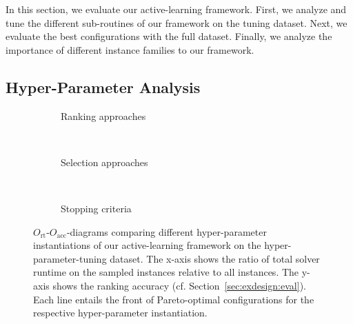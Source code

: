 \documentclass[runningheads]{llncs}
\begin{document}
In this section, we evaluate our active-learning framework.
First, we analyze and tune the different sub-routines of our framework on the tuning dataset.
Next, we evaluate the best configurations with the full dataset.
Finally, we analyze the importance of different instance families to our framework.

\subsection{Hyper-Parameter Analysis}

\begin{figure}[tbp!]
  \centering
  \begin{subfigure}{1.0\textwidth}
    \caption{Ranking approaches}
    \label{fig:annitraincolorranking}
  \end{subfigure}
  \\
  \vspace{0.2cm}
  \begin{subfigure}{1.0\textwidth}
    \caption{Selection approaches}
    \label{fig:annitraincolorselection}
  \end{subfigure}
  \\
  \vspace{0.2cm}
  \begin{subfigure}{1.0\textwidth}
    \caption{Stopping criteria}
    \label{fig:annitraincolorstopping}
  \end{subfigure}
  \caption{
    $O_{\operatorname{rt}}$-$O_{\operatorname{acc}}$-diagrams comparing different hyper-parameter instantiations of our active-learning framework on the hyper-parameter-tuning dataset.
    The x-axis shows the ratio of total solver runtime on the sampled instances relative to all instances.
    The y-axis shows the ranking accuracy (cf. Section~\ref{sec:exdesign:eval}).
    Each line entails the front of Pareto-optimal configurations for the respective hyper-parameter instantiation.
  }
  \label{fig:e2eallsolvers}
\end{figure}
\end{document}
